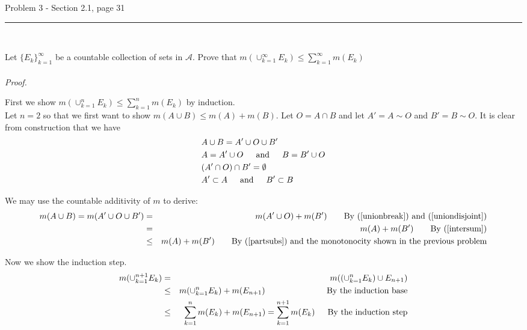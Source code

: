 \documentclass[11pt,reqno]{article}
\begin{document}
\begin{flushleft} 
Problem 3 - Section 2.1, page 31\\
\rule{500pt}{1pt}\\
\end{flushleft} 

Let $\{ E_k \}^\infty_{k = 1}$ be a countable collection of sets in $\mathcal{A}$. Prove that $m(\cup^\infty_{k=1} E_k) \le \sum^\infty_{k = 1} m(E_k)$
\\\\ \emph{Proof.}

First we show  $m(\cup^n_{k=1} E_k) \le \sum^n_{k = 1} m(E_k)$ by induction.\\
Let $n = 2$ so that we first want to show $m(A \cup B) \le m(A) + m(B)$. Let $O = A \cap B$ and let $A' = A \sim O$ and $B' = B \sim O$. It is clear from construction that we have
\begin{align}
&A \cup B = A' \cup O \cup B' \label{unionbreak} \\
&A = A' \cup O \hspace{15px} \text{and} \hspace{15px} B = B' \cup O \label{intersum} \\
&(A' \cap O) \cap B' = \emptyset \label{uniondisjoint} \\
&A' \subset A \hspace{15px} \text{and} \hspace{15px} B' \subset B \label{partsubs}
\end{align}

\noindent We may use the countable additivity of $m$ to derive:
\begin{eqnarray*}
m(A \cup B) = m(A' \cup O \cup B') &=& m(A' \cup O) + m(B') \hspace{20px} \text{By $(\ref{unionbreak})$ and $(\ref{uniondisjoint})$} \\		  
 &=&  m(A) + m(B') \hspace{20px} \text{By $(\ref{intersum})$} \\
 &\le&  m(A) + m(B') \hspace{20px} \text{By $(\ref{partsubs}$) and the monotonocity shown in the previous problem}
\end{eqnarray*}

\noindent Now we show the induction step.
\begin{eqnarray*}
m(\cup^{n+1}_{k=1} E_k) &=& m((\cup^n_{k=1} E_k) \cup E_{n+1}) \\
&\le& m(\cup^n_{k=1} E_k) + m(E_{n+1}) \hspace{73px} \text{By the induction base} \\
&\le&  \sum^n_{k = 1} m(E_k) + m(E_{n+1}) =  \sum^{n+1}_{k = 1} m(E_k) \hspace{15px} \text{By the induction step} \\
\end{eqnarray*}
\end{document}
